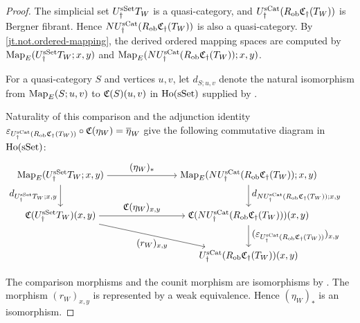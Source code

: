 \documentclass[a4paper,dvipdfmx,11pt]{amsart}
\begin{document}
\begin{proof}
  The simplicial set $U_{\dag}^{\mathrm{sSet}} T_W$ is a quasi-category, and $U_{\dag}^{\mathrm{sCat}}(R_{\mathrm{ob}}\mathfrak{C}_{\dag}(T_W))$ is Bergner fibrant.
  Hence $NU_{\dag}^{\mathrm{sCat}}(R_{\mathrm{ob}}\mathfrak{C}_{\dag}(T_W))$ is also a quasi-category.
  By \cref{jt.not.ordered-mapping}, the derived ordered mapping spaces are computed by $\operatorname{Map}_E(U_{\dag}^{\mathrm{sSet}} T_W;x,y)$ and $\operatorname{Map}_E(NU_{\dag}^{\mathrm{sCat}}(R_{\mathrm{ob}}\mathfrak{C}_{\dag}(T_W));x,y)$.
  
  For a quasi-category $S$ and vertices $u,v$, let $d_{S;u,v}$ denote the natural isomorphism from
  $\operatorname{Map}_E(S;u,v)$ to $\mathfrak{C}(S)(u,v)$ in $\mathrm{Ho}(\mathrm{sSet})$ supplied by \cite[Corollary~5.3]{DS11}.

  Naturality of this comparison and the adjunction identity $\varepsilon_{U_{\dag}^{\mathrm{sCat}}(R_{\mathrm{ob}}\mathfrak{C}_{\dag}(T_W))} \circ \mathfrak{C}(\eta_W) = \overline\eta_W$ give the following commutative diagram in $\mathrm{Ho}(\mathrm{sSet})$:
  \begin{align}
    &\begin{tikzpicture}[auto]
        \node (source-mapping) at (0,3) {$
          \Map_E(\UdagSSet T_W;x,y)$};
        \node (target-mapping) at (7,3) {$
          \Map_E
          (N\UdagSCat(R_{\rmob}\frakC_{\dag}(T_W));x,y)$};
        \node (source-rigidification) at (0,1.5) {$
          \frakC(\UdagSSet T_W)(x,y)$};
        \node (target-rigidification) at (7,1.5) {$
          \frakC
          (N\UdagSCat(R_{\rmob}\frakC_{\dag}(T_W)))(x,y)$};
        \node (target-category) at (7,0) {$
          \UdagSCat
          (R_{\rmob}\frakC_{\dag}(T_W))(x,y)$};
        \draw[->]
          (source-mapping) --
          node[above] {$(\eta_W)_*$}
          (target-mapping);
        \draw[->]
          (source-mapping) --
          node[left] {$d_{\UdagSSet T_W;x,y}$}
          (source-rigidification);
        \draw[->]
          (target-mapping) --
          node[right] {$d_{N\UdagSCat(R_{\rmob}\frakC_{\dag}(T_W));x,y}$}
          (target-rigidification);
        \draw[->]
          (source-rigidification) --
          node[above] {$\frakC(\eta_W)_{x,y}$}
          (target-rigidification);
        \draw[->]
          (source-rigidification) --
          node[below] {$(r_W)_{x,y}$}
          (target-category);
        \draw[->]
          (target-rigidification) --
          node[right] {$
            (\varepsilon_{\UdagSCat(R_{\rmob}\frakC_{\dag}(T_W))})_{x,y}$}
          (target-category);
      \end{tikzpicture}%
  \end{align}
  The comparison morphisms and the counit morphism are isomorphisms by \cite[Corollary~5.3 and Proposition~5.9]{DS11}.
  The morphism $(r_W)_{x,y}$ is represented by a weak equivalence.
  Hence $(\eta_W)_*$ is an isomorphism.
\end{proof}
\end{document}
